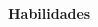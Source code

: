 \noindent\textbf{Habilidades}
\noindent\hrulefill
\vspace{0.25em}
\begin{adjustwidth}{1.5em}{0em}
\end{adjustwidth}
\vspace{0.25em}